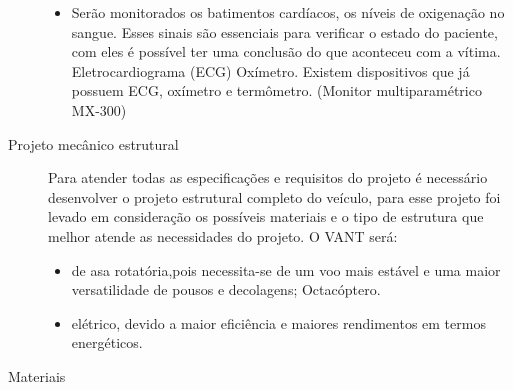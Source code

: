 \begin{description}
\begin{itemize}
	  \item Serão monitorados os batimentos cardíacos, os níveis de oxigenação no sangue. Esses sinais são essenciais para verificar o estado do paciente, com eles é possível ter uma conclusão do que aconteceu com a vítima. 
	    \subitem Eletrocardiograma (ECG)
	    \subitem Oxímetro.
		\subsubitem Existem dispositivos que já possuem ECG, oxímetro e termômetro. (Monitor multiparamétrico MX-300)
  	\end{itemize}
  \item[Projeto mecânico estrutural] \hfill 
  
      Para atender todas as especificações e requisitos do projeto é necessário desenvolver o projeto estrutural completo do veículo, para esse projeto foi levado em consideração os possíveis materiais e o tipo de estrutura que melhor atende as necessidades do projeto.
  	O VANT será:
  	\begin{itemize}
  		\item de asa rotatória,pois necessita-se de um voo mais estável e uma maior versatilidade de pousos e decolagens;
		  \subitem Octacóptero.
		\item elétrico, devido a maior eficiência e maiores rendimentos em termos energéticos.
  	\end{itemize}
  \item[Materiais] \hfill 
  

\end{description}
